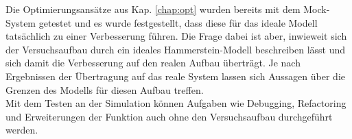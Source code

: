 \documentclass[../Report.tex]{subfiles}
\begin{document}
Die Optimierungsansätze aus Kap. \ref{chap:opt} wurden bereits mit dem Mock-System getestet und es wurde festgestellt, dass diese für das ideale Modell tatsächlich zu einer Verbesserung führen. Die Frage dabei ist aber, inwieweit sich der Versuchsaufbau durch ein ideales Hammerstein-Modell beschreiben lässt und sich damit die Verbesserung auf den realen Aufbau überträgt. Je nach Ergebnissen der Übertragung auf das reale System lassen sich Aussagen über die Grenzen des Modells für diesen Aufbau treffen.\\
Mit dem Testen an der Simulation können Aufgaben wie Debugging, Refactoring und Erweiterungen der Funktion auch ohne den Versuchsaufbau durchgeführt werden.
\end{document}
